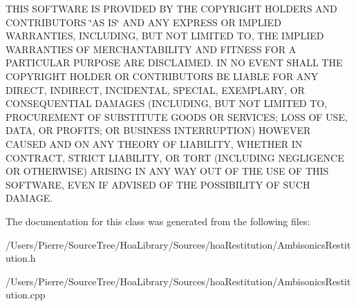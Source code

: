 T\-H\-I\-S S\-O\-F\-T\-W\-A\-R\-E I\-S P\-R\-O\-V\-I\-D\-E\-D B\-Y T\-H\-E C\-O\-P\-Y\-R\-I\-G\-H\-T H\-O\-L\-D\-E\-R\-S A\-N\-D C\-O\-N\-T\-R\-I\-B\-U\-T\-O\-R\-S \char`\"{}\-A\-S I\-S\char`\"{} A\-N\-D A\-N\-Y E\-X\-P\-R\-E\-S\-S O\-R I\-M\-P\-L\-I\-E\-D W\-A\-R\-R\-A\-N\-T\-I\-E\-S, I\-N\-C\-L\-U\-D\-I\-N\-G, B\-U\-T N\-O\-T L\-I\-M\-I\-T\-E\-D T\-O, T\-H\-E I\-M\-P\-L\-I\-E\-D W\-A\-R\-R\-A\-N\-T\-I\-E\-S O\-F M\-E\-R\-C\-H\-A\-N\-T\-A\-B\-I\-L\-I\-T\-Y A\-N\-D F\-I\-T\-N\-E\-S\-S F\-O\-R A P\-A\-R\-T\-I\-C\-U\-L\-A\-R P\-U\-R\-P\-O\-S\-E A\-R\-E D\-I\-S\-C\-L\-A\-I\-M\-E\-D. I\-N N\-O E\-V\-E\-N\-T S\-H\-A\-L\-L T\-H\-E C\-O\-P\-Y\-R\-I\-G\-H\-T H\-O\-L\-D\-E\-R O\-R C\-O\-N\-T\-R\-I\-B\-U\-T\-O\-R\-S B\-E L\-I\-A\-B\-L\-E F\-O\-R A\-N\-Y D\-I\-R\-E\-C\-T, I\-N\-D\-I\-R\-E\-C\-T, I\-N\-C\-I\-D\-E\-N\-T\-A\-L, S\-P\-E\-C\-I\-A\-L, E\-X\-E\-M\-P\-L\-A\-R\-Y, O\-R C\-O\-N\-S\-E\-Q\-U\-E\-N\-T\-I\-A\-L D\-A\-M\-A\-G\-E\-S (I\-N\-C\-L\-U\-D\-I\-N\-G, B\-U\-T N\-O\-T L\-I\-M\-I\-T\-E\-D T\-O, P\-R\-O\-C\-U\-R\-E\-M\-E\-N\-T O\-F S\-U\-B\-S\-T\-I\-T\-U\-T\-E G\-O\-O\-D\-S O\-R S\-E\-R\-V\-I\-C\-E\-S; L\-O\-S\-S O\-F U\-S\-E, D\-A\-T\-A, O\-R P\-R\-O\-F\-I\-T\-S; O\-R B\-U\-S\-I\-N\-E\-S\-S I\-N\-T\-E\-R\-R\-U\-P\-T\-I\-O\-N) H\-O\-W\-E\-V\-E\-R C\-A\-U\-S\-E\-D A\-N\-D O\-N A\-N\-Y T\-H\-E\-O\-R\-Y O\-F L\-I\-A\-B\-I\-L\-I\-T\-Y, W\-H\-E\-T\-H\-E\-R I\-N C\-O\-N\-T\-R\-A\-C\-T, S\-T\-R\-I\-C\-T L\-I\-A\-B\-I\-L\-I\-T\-Y, O\-R T\-O\-R\-T (I\-N\-C\-L\-U\-D\-I\-N\-G N\-E\-G\-L\-I\-G\-E\-N\-C\-E O\-R O\-T\-H\-E\-R\-W\-I\-S\-E) A\-R\-I\-S\-I\-N\-G I\-N A\-N\-Y W\-A\-Y O\-U\-T O\-F T\-H\-E U\-S\-E O\-F T\-H\-I\-S S\-O\-F\-T\-W\-A\-R\-E, E\-V\-E\-N I\-F A\-D\-V\-I\-S\-E\-D O\-F T\-H\-E P\-O\-S\-S\-I\-B\-I\-L\-I\-T\-Y O\-F S\-U\-C\-H D\-A\-M\-A\-G\-E. 

The documentation for this class was generated from the following files\-:\begin{DoxyCompactItemize}
\item 
/\-Users/\-Pierre/\-Source\-Tree/\-Hoa\-Library/\-Sources/hoa\-Restitution/Ambisonics\-Restitution.\-h\item 
/\-Users/\-Pierre/\-Source\-Tree/\-Hoa\-Library/\-Sources/hoa\-Restitution/Ambisonics\-Restitution.\-cpp\end{DoxyCompactItemize}
